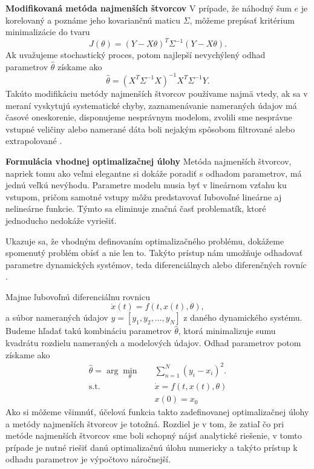 \textbf{Modifikovaná metóda najmenších štvorcov}
\newline
V prípade, že náhodný šum $ e $ je korelovaný a poznáme jeho kovariančnú maticu $ \Sigma $, môžeme prepísať kritérium minimalizácie do tvaru 
\begin{equation}
	J\left(\theta\right) = \left(Y - X\theta \right)^T \Sigma^{-1} \left(Y - X\theta \right).
\end{equation}
Ak uvažujeme stochastický proces, potom najlepší nevychýlený odhad parametrov $ \hat{\theta} $ získame ako
\begin{equation}
	\hat{\theta} = \left(X^T \Sigma^{-1} X\right)^{-1}X^T \Sigma^{-1} Y.
\end{equation}
Takúto modifikáciu metódy najmenších štvorcov používame najmä vtedy, ak sa v meraní vyskytujú systematické chyby, zaznamenávanie nameraných údajov má časové oneskorenie, disponujeme nesprávnym modelom, zvolili sme nesprávne vstupné veličiny alebo namerané dáta boli nejakým spôsobom filtrované alebo extrapolované \cite{fikar:identifikacia:1999}.

\textbf{Formulácia vhodnej optimalizačnej úlohy}
\newline
Metóda najmenších štvorcov, napriek tomu ako veľmi elegantne si dokáže poradiť s odhadom parametrov, má jednú veľkú nevýhodu. Parametre modelu musia byť v lineárnom vzťahu ku vstupom, pričom samotné vstupy môžu predstavovať ľubovoľné lineárne aj nelineárne funkcie. Týmto sa eliminuje značná časť problematík, ktoré jednoducho nedokáže vyriešiť. 

Ukazuje sa, že vhodným definovaním optimalizačného problému, dokážeme spomenutý problém obísť a nie len to. Takýto prístup nám umožňuje odhadovať parametre dynamických systémov, teda diferenciálnych alebo diferenčných rovníc \cite{villaverde:opt_param_est:2018}.

Majme ľubovoľnú diferenciálnu rovnicu
\begin{equation}
	\dot{x}(t) = f\left( t,x(t),\theta \right),
\end{equation} 
a súbor nameraných údajov $ y = [y_1, y_2, \dots , y_N] $ z daného dynamického systému. Budeme hľadať takú kombináciu parametrov $ \hat{\theta} $, ktorá minimalizuje sumu kvadrátu rozdielu nameraných a modelových údajov. Odhad parametrov potom získame ako
\begin{equation}
	\begin{split}
		\hat{\theta} = \arg \min_{\theta} \quad & \sum_{n=1}^{N} \left(y_{i} - x_{i}\right)^2. \\
		\textrm{s.t.} \quad & \dot{x} = f\left( t,x(t),\theta \right)\\
		 & x(0) = x_0
	\end{split}
\end{equation} 
Ako si môžeme všimnúť, účelová funkcia takto zadefinovanej optimalizačnej úlohy a metódy najmenších štvorcov je totožná. Rozdiel je v tom, že zatiaľ čo pri metóde najmenších štvorcov sme boli schopný nájsť analytické riešenie, v tomto prípade je nutné riešiť danú optimalizačnú úlohu numericky a takýto prístup k odhadu parametrov je výpočtovo náročnejší.


